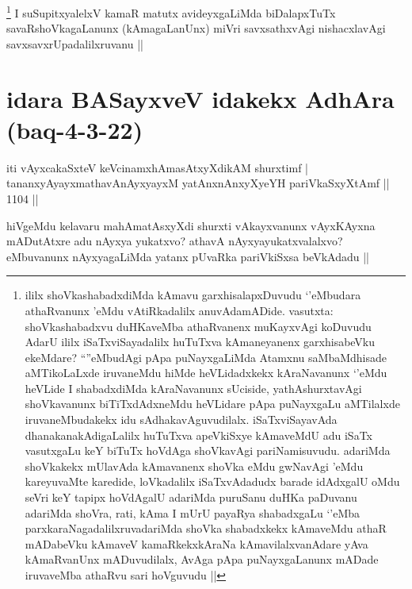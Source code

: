\begin{artha}
\footnote{ililx shoVkashabadxdiMda kAmavu garxhisalapxDuvudu `\stext'eMbudara athaRvanunx \stext'eMdu vAtiRkadalilx anuvAdamADide. vasutxta: shoVkashabadxvu duHKaveMba athaRvanenx muKayxvAgi koDuvudu AdarU ililx iSaTxviSayadalilx huTuTxva kAmaneyanenx garxhisabeVku ekeMdare? ``\stext''eMbudAgi pApa puNayxgaLiMda Atamxnu saMbaMdhisade aMTikoLaLxde iruvaneMdu hiMde heVLidadxkekx kAraNavanunx `\stext'eMdu heVLide I shabadxdiMda kAraNavanunx sUciside, yathAshurxtavAgi shoVkavanunx biTiTxdAdxneMdu heVLidare pApa puNayxgaLu aMTilalxde iruvaneMbudakekx idu sAdhakavAguvudilalx. iSaTxviSayavAda dhanakanakAdigaLalilx huTuTxva apeVkiSxye kAmaveMdU adu iSaTx vasutxgaLu keY biTuTx hoVdAga shoVkavAgi pariNamisuvudu. adariMda shoVkakekx mUlavAda kAmavanenx shoVka eMdu gwNavAgi \stext'eMdu kareyuvaMte karedide, loVkadalilx iSaTxvAdadudx barade idAdxgalU oMdu seVri keY tapipx hoVdAgalU adariMda puruSanu duHKa paDuvanu adariMda shoVra, rati, kAma I mUrU payaRya shabadxgaLu `\stext'eMba parxkaraNagadalilxruvadariMda shoVka shabadxkekx kAmaveMdu athaR mADabeVku kAmaveV kamaRkekxkAraNa kAmavilalxvanAdare yAva kAmaRvanUnx mADuvudilalx, AvAga pApa puNayxgaLanunx mADade iruvaveMba athaRvu sari hoVguvudu ||}
I suSupitxyalelxV kamaR matutx avideyxgaLiMda biDalapxTuTx savaRshoVkagaLanunx (kAmagaLanUnx) miVri savxsathxvAgi nishacxlavAgi savxsavxrUpadalilxruvanu ||
\end{artha}

\section*{idara BASayxveV idakekx AdhAra (baq-4-3-22)}


\begin{shl}
iti vAyxcakaSxteV keVcinamxhAmasAtxyXdikAM shurxtimf | \\
tananxyAyayxmathavA\s nAyxyayxM yatAnxnAnxyXyeYH pariVkaSxyXtAmf \hfill ||  1104 ||  
\end{shl}

\begin{artha}
hiVgeMdu kelavaru mahAmatAsxyXdi shurxti vAkayxvanunx vAyxKAyxna mADutAtxre adu nAyxya yukatxvo? athavA nAyxyayukatxvalalxvo? eMbuvanunx nAyxyagaLiMda yatanx pUvaRka pariVkiSxsa beVkAdadu ||
\end{artha}


